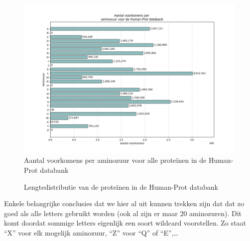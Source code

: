 \documentclass[11pt,dutch,faculty=we,layout=titlefont,underline=false,titleUppercase=true,titleUnderline=true]{ugent2016-report}
\begin{document}
    \begin{figure}[H]
        \centering
        \includegraphics[width=0.7\linewidth]{humanprot_aminozuur_voorkomens}
        \caption{Aantal voorkomens per aminozuur voor alle proteïnen in de Human-Prot databank}
        \label{fig:humanprot_aminozuur}
    \end{figure}

    \begin{figure}[H]
        \centering
        \caption{Lengtedistributie van de proteïnen in de Human-Prot databank}\label{fig:humanprot_length}
    \end{figure}

    Enkele belangrijke conclusies dat we hier al uit kunnen trekken zijn dat dat zo goed als alle letters gebruikt worden (ook al zijn er maar 20 aminozuren).
    Dit komt doordat sommige letters eigenlijk een soort wildcard voorstellen.
    Zo staat ``X'' voor elk mogelijk aminozuur, ``Z'' voor ``Q'' of ``E'',\ldots
\end{document}
